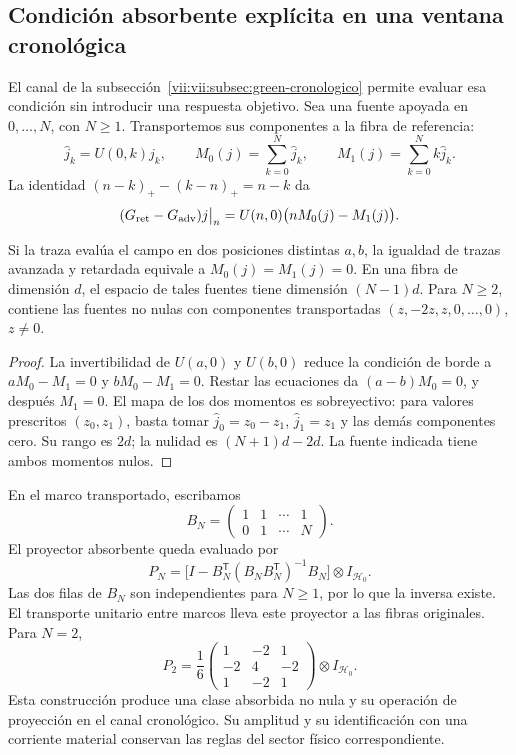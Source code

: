 \subsection{Condición absorbente explícita en una ventana cronológica}
\label{vii:vii:subsec:absorcion-momentos}

El canal de la subsección~\ref{vii:vii:subsec:green-cronologico} permite
evaluar esa condición sin introducir una respuesta objetivo. Sea una
fuente apoyada en \(0,\ldots,N\), con \(N\geq1\). Transportemos
sus componentes a la fibra de referencia:
\[
 \widehat j_k=U(0,k)j_k,\qquad
 M_0(j)=\sum_{k=0}^N\widehat j_k,\qquad
 M_1(j)=\sum_{k=0}^Nk\widehat j_k.
\]
La identidad \((n-k)_+-(k-n)_+=n-k\) da
\begin{equation}
 (G_{\rm ret}-G_{\rm adv})j\big|_n
 =U(n,0)\bigl(nM_0(j)-M_1(j)\bigr).
 \label{vii:vii:eq:diferencia-green-momentos}
\end{equation}

\begin{proposition}
\label{vii:vii:prop:absorcion-momentos}
Si la traza evalúa el campo en dos posiciones distintas \(a,b\),
la igualdad de trazas avanzada y retardada equivale a
\(M_0(j)=M_1(j)=0\). En una fibra de dimensión \(d\), el espacio
de tales fuentes tiene dimensión \((N-1)d\). Para \(N\geq2\),
contiene las fuentes no nulas con componentes transportadas
\((z,-2z,z,0,\ldots,0)\), \(z\neq0\).
\end{proposition}
\begin{proof}
La invertibilidad de \(U(a,0)\) y \(U(b,0)\) reduce la condición
de borde a \(aM_0-M_1=0\) y \(bM_0-M_1=0\).
Restar las ecuaciones da \((a-b)M_0=0\), y después \(M_1=0\).
El mapa de los dos momentos es sobreyectivo: para valores prescritos
\((z_0,z_1)\), basta tomar
\(\widehat j_0=z_0-z_1\), \(\widehat j_1=z_1\) y las demás
componentes cero. Su rango es \(2d\); la nulidad es
\((N+1)d-2d\). La fuente indicada tiene ambos momentos nulos.
\end{proof}

En el marco transportado, escribamos
\[
 B_N=\begin{pmatrix}1&1&\cdots&1\\0&1&\cdots&N\end{pmatrix}.
\]
El proyector absorbente queda evaluado por
\begin{equation}
 P_N=\bigl[I-B_N^{\mathsf T}(B_NB_N^{\mathsf T})^{-1}B_N\bigr]
       \otimes I_{\mathcal H_0}.
 \label{vii:vii:eq:proyector-momentos-cronologicos}
\end{equation}
Las dos filas de \(B_N\) son independientes para \(N\geq1\), por lo
que la inversa existe. El transporte unitario entre marcos lleva este
proyector a las fibras originales. Para \(N=2\),
\[
 P_2=\frac16
 \begin{pmatrix}1&-2&1\\-2&4&-2\\1&-2&1\end{pmatrix}
 \otimes I_{\mathcal H_0}.
\]
Esta construcción produce una clase absorbida no nula y su operación de
proyección en el canal cronológico. Su amplitud y su identificación con una
corriente material conservan las reglas del sector físico correspondiente.

